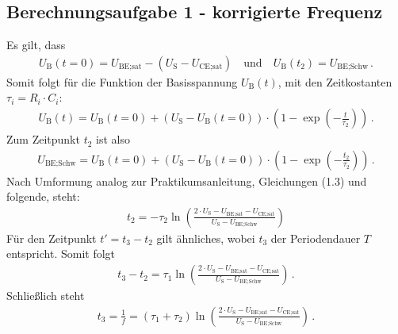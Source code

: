 \documentclass[numbers=noenddot,10pt,a4paper]{scrartcl}
\newcommand{\indx}[1]{_\text{#1}}
\begin{document}
\subsection{Berechnungsaufgabe 1 - korrigierte Frequenz}
Es gilt, dass
\begin{align}
U\indx{B}(t=0)=U\indx{BE;sat}-(U\indx{S}-U\indx{CE;sat}) \quad \text{und} \quad U\indx{B}(t\indx{2})=U\indx{BE;Schw} \, .
\end{align}
Somit folgt für die Funktion der Basisspannung $U\indx{B}(t)$, mit den Zeitkostanten $\tau_i=R_i\cdot C_i$:
\begin{align}
U\indx{B}(t)=U\indx{B}(t=0)+(U\indx{S}-U\indx{B}(t=0))\cdot\left(1-\exp\left(-\frac{t}{\tau\indx{2}}\right)\right) \, .
\end{align}
Zum Zeitpunkt $t\indx{2}$ ist also
\begin{align}
U\indx{BE;Schw}=U\indx{B}(t=0)+(U\indx{S}-U\indx{B}(t=0))\cdot\left(1-\exp\left(-\frac{t\indx{2}}{\tau\indx{2}}\right)\right) \, .
\end{align}
Nach Umformung analog zur Praktikumsanleitung, Gleichungen (1.3) und folgende, steht:
\begin{align}
t\indx{2}=-\tau\indx{2}\ln\left(\frac{2\cdot U\indx{S}-U\indx{BE;sat}-U\indx{CE;sat}}{U\indx{S}-U\indx{BE;Schw}}\right)
\end{align}
Für den Zeitpunkt $t'=t\indx{3}-t\indx{2}$ gilt ähnliches, wobei $t\indx{3}$ der Periodendauer $T$ entspricht. Somit folgt
\begin{align}
t_3-t_2=\tau_1 \ln\left(\frac{2\cdot U\indx{S}-U\indx{BE;sat}-U\indx{CE;sat}}{U\indx{S}-U\indx{BE;Schw}}\right) \, .
\end{align}
Schließlich steht
\begin{align}
t_3=\frac{1}{f}=(\tau_1+\tau_2)\ln\left(\frac{2\cdot U\indx{S}-U\indx{BE;sat}-U\indx{CE;sat}}{U\indx{S}-U\indx{BE;Schw}}\right) \, . \label{eq:freq}
\end{align}
\end{document}
